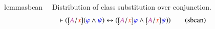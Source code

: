 \dfdif

\dfun

\dfin

\dfv

\begin{restatable}{lemma}{sbcan}~~ Distribution of class substitution over
conjunction.  ~  ~
\begin{align}
\vdash ( \underaccent{\dot}{[} \mc{A} / \msc{x} \underaccent{\dot}{]} (
    \mw{\varphi} \wedge \mw{\psi} ) \leftrightarrow ( \underaccent{\dot}{[}
    \mc{A} / \msc{x} \underaccent{\dot}{]} \mw{\varphi} \wedge
    \underaccent{\dot}{[} \mc{A} / \msc{x} \underaccent{\dot}{]} \mw{\psi} )
    )\label{eq:sbcan}\tag{sbcan}
\end{align}
\end{restatable}

